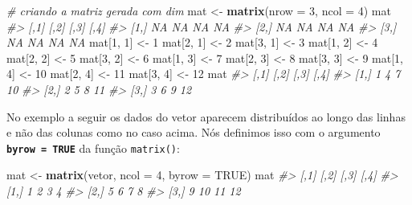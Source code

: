\documentclass[]{book}
\newenvironment{Shaded}{\begin{snugshade}}{\end{snugshade}}
\newcommand{\KeywordTok}[1]{\textcolor[rgb]{0.13,0.29,0.53}{\textbf{#1}}}
\newcommand{\DataTypeTok}[1]{\textcolor[rgb]{0.13,0.29,0.53}{#1}}
\newcommand{\DecValTok}[1]{\textcolor[rgb]{0.00,0.00,0.81}{#1}}
\newcommand{\StringTok}[1]{\textcolor[rgb]{0.31,0.60,0.02}{#1}}
\newcommand{\CommentTok}[1]{\textcolor[rgb]{0.56,0.35,0.01}{\textit{#1}}}
\newcommand{\OtherTok}[1]{\textcolor[rgb]{0.56,0.35,0.01}{#1}}
\newcommand{\NormalTok}[1]{#1}
\begin{document}
\begin{Shaded}
\begin{Highlighting}[]
\CommentTok{# criando a matriz gerada com dim}
\NormalTok{mat <-}\StringTok{ }\KeywordTok{matrix}\NormalTok{(}\DataTypeTok{nrow =} \DecValTok{3}\NormalTok{, }\DataTypeTok{ncol =} \DecValTok{4}\NormalTok{)}
\NormalTok{mat}
\CommentTok{#>      [,1] [,2] [,3] [,4]}
\CommentTok{#> [1,]   NA   NA   NA   NA}
\CommentTok{#> [2,]   NA   NA   NA   NA}
\CommentTok{#> [3,]   NA   NA   NA   NA}
\NormalTok{mat[}\DecValTok{1}\NormalTok{, }\DecValTok{1}\NormalTok{] <-}\StringTok{ }\DecValTok{1}
\NormalTok{mat[}\DecValTok{2}\NormalTok{, }\DecValTok{1}\NormalTok{] <-}\StringTok{ }\DecValTok{2}
\NormalTok{mat[}\DecValTok{3}\NormalTok{, }\DecValTok{1}\NormalTok{] <-}\StringTok{ }\DecValTok{3}
\NormalTok{mat[}\DecValTok{1}\NormalTok{, }\DecValTok{2}\NormalTok{] <-}\StringTok{ }\DecValTok{4}
\NormalTok{mat[}\DecValTok{2}\NormalTok{, }\DecValTok{2}\NormalTok{] <-}\StringTok{ }\DecValTok{5}
\NormalTok{mat[}\DecValTok{3}\NormalTok{, }\DecValTok{2}\NormalTok{] <-}\StringTok{ }\DecValTok{6}
\NormalTok{mat[}\DecValTok{1}\NormalTok{, }\DecValTok{3}\NormalTok{] <-}\StringTok{ }\DecValTok{7}
\NormalTok{mat[}\DecValTok{2}\NormalTok{, }\DecValTok{3}\NormalTok{] <-}\StringTok{ }\DecValTok{8}
\NormalTok{mat[}\DecValTok{3}\NormalTok{, }\DecValTok{3}\NormalTok{] <-}\StringTok{ }\DecValTok{9}
\NormalTok{mat[}\DecValTok{1}\NormalTok{, }\DecValTok{4}\NormalTok{] <-}\StringTok{ }\DecValTok{10}
\NormalTok{mat[}\DecValTok{2}\NormalTok{, }\DecValTok{4}\NormalTok{] <-}\StringTok{ }\DecValTok{11}
\NormalTok{mat[}\DecValTok{3}\NormalTok{, }\DecValTok{4}\NormalTok{] <-}\StringTok{ }\DecValTok{12}
\NormalTok{mat}
\CommentTok{#>      [,1] [,2] [,3] [,4]}
\CommentTok{#> [1,]    1    4    7   10}
\CommentTok{#> [2,]    2    5    8   11}
\CommentTok{#> [3,]    3    6    9   12}
\end{Highlighting}
\end{Shaded}

No exemplo a seguir os dados do vetor aparecem distribuídos ao longo das
linhas e não das colunas como no caso acima. Nós definimos isso com o
argumento \textbf{\texttt{byrow\ =\ TRUE}} da função \texttt{matrix()}:

\begin{Shaded}
\begin{Highlighting}[]
\NormalTok{mat <-}\StringTok{ }\KeywordTok{matrix}\NormalTok{(vetor, }\DataTypeTok{ncol =} \DecValTok{4}\NormalTok{, }\DataTypeTok{byrow =} \OtherTok{TRUE}\NormalTok{)}
\NormalTok{mat}
\CommentTok{#>      [,1] [,2] [,3] [,4]}
\CommentTok{#> [1,]    1    2    3    4}
\CommentTok{#> [2,]    5    6    7    8}
\CommentTok{#> [3,]    9   10   11   12}
\end{Highlighting}
\end{Shaded}
\end{document}
